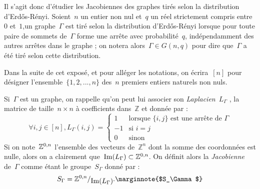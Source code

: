 \vspace*{0.3cm}
	Il s'agit donc d'étudier les Jacobiennes des graphes tirés selon la distribution d'Erd\H{o}s-Rényi. Soient~$n$ un entier non nul et~$q$ un réel strictement compris entre~$0$ et~$1$,un graphe~$\Gamma$ est tiré selon la distribution d'Erd\H{o}s-Rényi lorsque pour toute paire de sommets de~$\Gamma$ forme une arrête avec probabilité~$q$, indépendamment des autres arrêtes dans le graphe ; on notera alors~$\Gamma\in G(n,q)$ pour dire que~$\Gamma$ a été tiré selon cette distribution.
	
	Dans la suite de cet exposé, et pour alléger les notations, on écrira~$[n]$\marginnote{$[n]$} pour désigner l'ensemble~$\{1,2,...,n\}$ des~$n$ premiers entiers naturels non nuls.
	
	Si~$\Gamma$ est un graphe, on rappelle qu'on peut lui associer son \emph{Laplacien}~$L_\Gamma$ , la matrice de taille~$n\times n$ à coefficients dans~$\mathbb{Z}$ et donnée par :
	\[
		\forall i,j\in[n], L_\Gamma(i,j) = 
			\begin{cases}
				1 &\text{lorsque }\{i,j\}\text{ est une arrête de }\Gamma \\
				-1 &\text{si }i=j\\
				0 &\text{sinon}
			\end{cases}
	\]
	Si on note~$\Zzero$\marginnote{$\Zzero$} l'ensemble des vecteurs de~$\mathbb{Z}^n$ dont la somme des coordonnées est nulle, alors on a clairement que~$\operatorname{Im}(L_\Gamma) \subset \mathbb{Z}^{0,n}$. On définit alors la \emph{Jacobienne} de~$\Gamma$ comme étant le groupe~$S_\Gamma$ donné par :
	\[
		S_\Gamma = \quotient{\Zzero}{\Im(L_\Gamma)}.\text{\marginnote{$S_\Gamma$}}
	\]